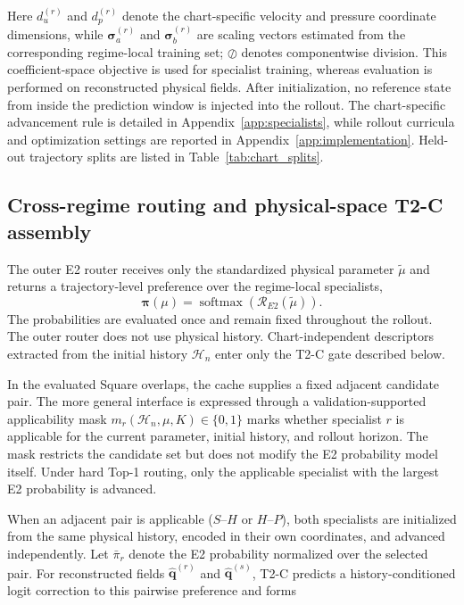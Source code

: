 \documentclass{article}
\begin{document}
Here $d_u^{(r)}$ and $d_p^{(r)}$ denote the chart-specific velocity and pressure coordinate dimensions, while $\bm\sigma_a^{(r)}$ and $\bm\sigma_b^{(r)}$ are scaling
vectors estimated from the corresponding regime-local training set; $\oslash$ denotes componentwise division. This coefficient-space objective is used for specialist training, whereas evaluation is performed on reconstructed physical fields. After initialization, no reference state from inside the prediction window is injected into the rollout. The chart-specific advancement rule is detailed in Appendix~\ref{app:specialists}, while rollout curricula and optimization settings are reported in Appendix~\ref{app:implementation}. Held-out trajectory splits are listed in Table~\ref{tab:chart_splits}.



\subsection{Cross-regime routing and physical-space T2-C assembly}

The outer E2 router receives only the standardized physical parameter $\widetilde\mu$ and returns a trajectory-level preference over the
regime-local specialists,
\[
\bm\pi(\mu)
=
\operatorname{softmax}\!\left(
\mathcal R_{E2}(\widetilde\mu)
\right).
\]
The probabilities are evaluated once and remain fixed throughout the rollout. The outer router does not use physical history. Chart-independent descriptors extracted from the initial history $\mathcal H_n$ enter only the T2-C gate described below.

In the evaluated Square overlaps, the cache supplies a fixed adjacent candidate pair. The more general interface is expressed through a validation-supported applicability mask $m_r(\mathcal H_n,\mu,K)\in\{0,1\}$ marks whether specialist $r$ is applicable for the current parameter, initial history, and rollout horizon. The mask restricts the candidate set but does not modify the E2 probability
model itself. Under hard Top-1 routing, only the applicable specialist with the largest E2 probability is advanced.

When an adjacent pair is applicable ($S$--$H$ or $H$--$P$), both specialists are initialized from the same physical history, encoded in
their own coordinates, and advanced independently. Let $\bar\pi_r$ denote the E2 probability normalized over the selected pair. For reconstructed fields $\widehat{\bm q}^{(r)}$ and $\widehat{\bm q}^{(s)}$, T2-C predicts a history-conditioned logit correction to this pairwise preference and forms
\end{document}

